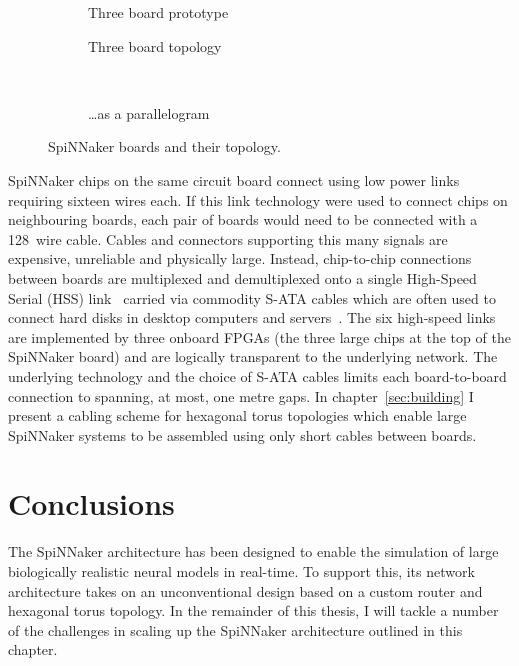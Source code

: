 \begin{figure}
\begin{subfigure}[b]{0.45\linewidth}
				\caption{Three board prototype}
				\label{fig:threeboard}
			\end{subfigure}
			
			\vspace*{1em}
			
			\begin{subfigure}[b]{0.45\linewidth}
				\center
				
				\caption{Three board topology}
				\label{fig:threeboard-separate}
			\end{subfigure}
			~~~
			\begin{subfigure}[b]{0.45\linewidth}
				\center
				
				\caption{\ldots{}as a parallelogram}
				\label{fig:threeboard-wrapped}
			\end{subfigure}
			
			\caption{SpiNNaker boards and their topology.}
			\label{fig:spinnaker-boards}
		\end{figure}
		
		
		SpiNNaker chips on the same circuit board connect using low power links
		requiring sixteen wires each.  If this link technology were used to connect
		chips on neighbouring boards, each pair of boards would need to be
		connected with a 128~wire cable.  Cables and connectors supporting this
		many signals are expensive, unreliable and physically large. Instead,
		chip-to-chip connections between boards are multiplexed and demultiplexed
		onto a single High-Speed Serial (HSS) link~\cite{athavale05} carried via
		commodity S-ATA cables which are often used to connect hard disks in
		desktop computers and servers~\cite{sata3spec}. The six high-speed links
		are implemented by three onboard FPGAs (the three large chips at the top of
		the SpiNNaker board) and are logically transparent to the underlying
		network. The underlying technology and the choice of S-ATA cables limits
		each board-to-board connection to spanning, at most, one metre gaps. In
		chapter~\ref{sec:building} I present a cabling scheme for hexagonal torus
		topologies which enable large SpiNNaker systems to be assembled using only
		short cables between boards.
		
	\section{Conclusions}
		
		The SpiNNaker architecture has been designed to enable the simulation of
		large biologically realistic neural models in real-time. To support this,
		its network architecture takes on an unconventional design based on a
		custom router and hexagonal torus topology. In the remainder of this
		thesis, I will tackle a number of the challenges in scaling up the
		SpiNNaker architecture outlined in this chapter.
